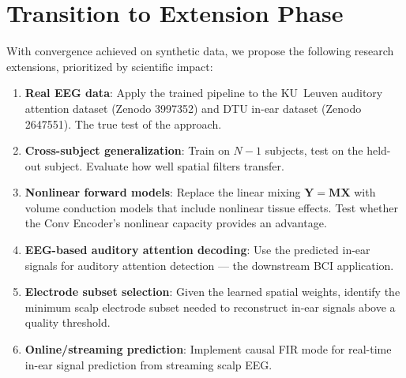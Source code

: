 \documentclass[11pt,a4paper]{article}
\begin{document}
\section{Transition to Extension Phase}

With convergence achieved on synthetic data, we propose the following research
extensions, prioritized by scientific impact:

\begin{enumerate}
  \item \textbf{Real EEG data}: Apply the trained pipeline to the KU~Leuven
    auditory attention dataset (Zenodo 3997352) and DTU in-ear dataset
    (Zenodo 2647551). The true test of the approach.

  \item \textbf{Cross-subject generalization}: Train on $N-1$ subjects, test
    on the held-out subject. Evaluate how well spatial filters transfer.

  \item \textbf{Nonlinear forward models}: Replace the linear mixing
    $\mathbf{Y} = \mathbf{M}\mathbf{X}$ with volume conduction models that
    include nonlinear tissue effects. Test whether the Conv Encoder's nonlinear
    capacity provides an advantage.

  \item \textbf{EEG-based auditory attention decoding}: Use the predicted in-ear
    signals for auditory attention detection --- the downstream BCI application.

  \item \textbf{Electrode subset selection}: Given the learned spatial weights,
    identify the minimum scalp electrode subset needed to reconstruct in-ear
    signals above a quality threshold.

  \item \textbf{Online/streaming prediction}: Implement causal FIR mode for
    real-time in-ear signal prediction from streaming scalp EEG.
\end{enumerate}
\end{document}
